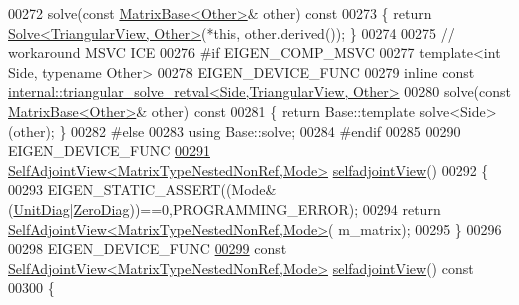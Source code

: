 \begin{DoxyCode}
00272     solve(\textcolor{keyword}{const} \hyperlink{group___core___module_class_eigen_1_1_matrix_base}{MatrixBase<Other>}& other)\textcolor{keyword}{ const}
00273 \textcolor{keyword}{    }\{ \textcolor{keywordflow}{return} \hyperlink{group___core___module_class_eigen_1_1_solve}{Solve<TriangularView, Other>}(*\textcolor{keyword}{this}, other.derived()); \}
00274     
00275   \textcolor{comment}{// workaround MSVC ICE}
00276 \textcolor{preprocessor}{  #if EIGEN\_COMP\_MSVC}
00277     \textcolor{keyword}{template}<\textcolor{keywordtype}{int} S\textcolor{keywordtype}{id}e, \textcolor{keyword}{typename} Other>
00278     EIGEN\_DEVICE\_FUNC
00279     \textcolor{keyword}{inline} \textcolor{keyword}{const} \hyperlink{struct_eigen_1_1internal_1_1triangular__solve__retval}{internal::triangular\_solve\_retval<Side,TriangularView, Other>}
00280     solve(\textcolor{keyword}{const} \hyperlink{group___core___module_class_eigen_1_1_matrix_base}{MatrixBase<Other>}& other)\textcolor{keyword}{ const}
00281 \textcolor{keyword}{    }\{ \textcolor{keywordflow}{return} Base::template solve<Side>(other); \}
00282 \textcolor{preprocessor}{  #else}
00283     \textcolor{keyword}{using} Base::solve;
00284 \textcolor{preprocessor}{  #endif}
00285 
00290     EIGEN\_DEVICE\_FUNC
\hyperlink{group___core___module_a1fe2e5e93164b2efb5124297b096fb10}{00291}     \hyperlink{group___core___module_class_eigen_1_1_self_adjoint_view}{SelfAdjointView<MatrixTypeNestedNonRef,Mode>} 
      \hyperlink{group___core___module_a1fe2e5e93164b2efb5124297b096fb10}{selfadjointView}()
00292     \{
00293       EIGEN\_STATIC\_ASSERT((Mode&(\hyperlink{group__enums_gga39e3366ff5554d731e7dc8bb642f83cdaddb72f888ac85d5a1c52333e54f9374b}{UnitDiag}|\hyperlink{group__enums_gga39e3366ff5554d731e7dc8bb642f83cda884ff7240392e85aa6e4b3c957e36483}{ZeroDiag}))==0,PROGRAMMING\_ERROR);
00294       \textcolor{keywordflow}{return} \hyperlink{group___core___module_class_eigen_1_1_self_adjoint_view}{SelfAdjointView<MatrixTypeNestedNonRef,Mode>}(
      m\_matrix);
00295     \}
00296 
00298     EIGEN\_DEVICE\_FUNC
\hyperlink{group___core___module_ade4c489f8fb9f5e31d3c3a64e19c166a}{00299}     \textcolor{keyword}{const} \hyperlink{group___core___module_class_eigen_1_1_self_adjoint_view}{SelfAdjointView<MatrixTypeNestedNonRef,Mode>} 
      \hyperlink{group___core___module_ade4c489f8fb9f5e31d3c3a64e19c166a}{selfadjointView}()\textcolor{keyword}{ const}
00300 \textcolor{keyword}{    }\{

\end{DoxyCode}
